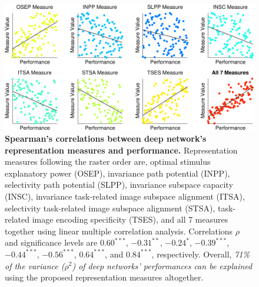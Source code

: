 \documentclass[10pt,twocolumn,letterpaper]{article}
\begin{document}
\begin{figure}
\begin{center}
\includegraphics[width=0.95\columnwidth]{Figs/e_fig7_scatter-crop.pdf} 
\end{center}
\caption{{\bf Spearman's correlations between deep network's representation measures and performance.}
Representation measures following the raster order are, optimal stimulus explanatory power (OSEP), invariance path potential (INPP), selectivity path potential (SLPP), invariance subspace capacity (INSC), invariance \vs task-related image subspace alignment (ITSA), selectivity \vs task-related image subspace alignment (STSA), task-related image encoding specificity (TSES), and all 7 measures together using linear multiple correlation analysis.
Correlations $\rho$ and significance levels are $0.60^{\ast\ast\ast}$, $-0.31^{\ast\ast}$, $-0.24^{\ast}$, $-0.39^{\ast\ast\ast}$, $-0.44^{\ast\ast\ast}$, $-0.56^{\ast\ast\ast}$, $0.64^{\ast\ast\ast}$, and $0.84^{\ast\ast\ast}$, respectively.
Overall, \emph{71\% of the variance ($\rho^2$) of deep networks' performances can be explained} using the proposed representation measures altogether.
}
\label{fig:corr}
\end{figure}
\end{document}
